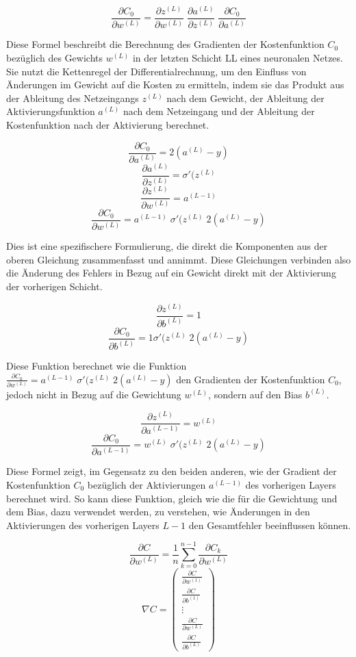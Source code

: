 \[\frac{\partial C_0}{\partial w^{(L)}} = \frac{\partial z^{(L)}}{\partial w^{(L)}}\; \frac{\partial a^{(L)}}{\partial z^{(L)}}\; \frac{\partial C_0}{\partial a^{(L)}}\] %

\noindent Diese Formel beschreibt die Berechnung des Gradienten der Kostenfunktion $C_0$ bezüglich des Gewichts $w^{(L)}$ in der letzten Schicht LL eines neuronalen Netzes. Sie nutzt die Kettenregel der Differentialrechnung, um den Einfluss von Änderungen im Gewicht auf die Kosten zu ermitteln, indem sie das Produkt aus der Ableitung des Netzeingangs $z^{(L)}$ nach dem Gewicht, der Ableitung der Aktivierungsfunktion $a^{(L)}$ nach dem Netzeingang und der Ableitung der Kostenfunktion nach der Aktivierung berechnet.

\[\frac{\partial C_0}{\partial a^{(L)}} = 2(a^{(L)}-y)\]
\[\frac{\partial a^{(L)}}{\partial z^{(L)}} = \sigma '(z^{(L)}\]
\[\frac{\partial z^{(L)}}{\partial w^{(L)}} = a^{(L-1)}\]
\[\frac{\partial C_0}{\partial w^{(L)}} = a^{(L-1)}\; \sigma '(z^{(L)}\; 2(a^{(L)}-y)\]

\noindent Dies ist eine spezifischere Formulierung, die direkt die Komponenten aus der oberen Gleichung zusammenfasst und annimmt. Diese Gleichungen verbinden also die Änderung des Fehlers in Bezug auf ein Gewicht direkt mit der Aktivierung der vorherigen Schicht.

\[\frac{\partial z^{(L)}}{\partial b^{(L)}} = 1\]
\[\frac{\partial C_0}{\partial b^{(L)}} = 1 \sigma '(z^{(L)}\; 2(a^{(L)}-y)\]

\noindent Diese Funktion berechnet wie die Funktion $\frac{\partial C_0}{\partial w^{(L)}} = a^{(L-1)}\; \sigma '(z^{(L)}\; 2(a^{(L)}-y)$ den Gradienten der Kostenfunktion $C_0$, jedoch nicht in Bezug auf die Gewichtung $w^{(L)}$, sondern auf den Bias $b^{(L)}$.

\[\frac{\partial z^{(L)}}{\partial a^{(L-1)}} = w^{(L)}\]
\[\frac{\partial C_0}{\partial a^{(L-1)}} = w^{(L)}\; \sigma '(z^{(L)}\; 2(a^{(L)}-y)\]

\noindent Diese Formel zeigt, im Gegensatz zu den beiden anderen, wie der Gradient der Kostenfunktion $C_0$ bezüglich der Aktivierungen $a^{(L-1)}$ des vorherigen Layers berechnet wird. So kann diese Funktion, gleich wie die für die Gewichtung und dem Bias, dazu verwendet werden, zu verstehen, wie Änderungen in den Aktivierungen des vorherigen Layers $L-1$ den Gesamtfehler beeinflussen können.

\[\frac{\partial C}{\partial w^{(L)}} = \frac{1}{n}\sum_{k=0}^{n-1} \frac{\partial C_{k}}{\partial w^{(L)}}\]
\[\nabla C = \left(\begin{array}{c} \frac{\partial C}{\partial w^{(1)}} \\ \frac{\partial C}{\partial b^{(1)}} \\ \vdots \\ \frac{\partial C}{\partial w^{(L)}} \\ \frac{\partial C}{\partial b^{(L)}} \end{array}\right)\] %

